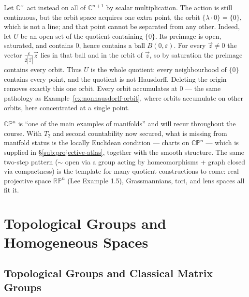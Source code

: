 \documentclass[11pt]{report}
\makeatletter
\newcounter{excounter}[section]
\newcommand{\exlabel}[1]{\edef\@currentlabel{\arabic{section}.\arabic{excounter}}\label{#1}}
\makeatother
\begin{document}
\begin{exbox}\exlabel{ex:cpn-origin}
Let $\mathbb{C}^\times$ act instead on all of $\mathbb{C}^{n+1}$ by scalar multiplication. The action is still continuous, but the orbit space acquires one extra point, the orbit $\{\lambda \cdot 0\} = \{0\}$, which is not a line; and that point cannot be separated from any other. Indeed, let $U$ be an open set of the quotient containing $\{0\}$. Its preimage is open, saturated, and contains $0$, hence contains a ball $B(0,\varepsilon)$. For every $\vec z \neq 0$ the vector $\frac{\varepsilon}{2|\vec z|}\vec z$ lies in that ball and in the orbit of $\vec z$, so by saturation the preimage contains every orbit. Thus $U$ is the whole quotient: every neighbourhood of $\{0\}$ contains every point, and the quotient is not Hausdorff. Deleting the origin removes exactly this one orbit. Every orbit accumulates at $0$ --- the same pathology as Example~\ref{ex:nonhausdorff-orbit}, where orbits accumulate on other orbits, here concentrated at a single point.
\end{exbox}

\begin{rembox}\label{rem:where-this-going}
$\mathbb{CP}^n$ is ``one of the main examples of manifolds'' and will recur throughout the course. With $T_2$ and second countability now secured, what is missing from manifold status is the locally Euclidean condition --- charts on $\mathbb{CP}^n$ --- which is supplied in \S\ref{sub:projective-atlas}, together with the smooth structure. The same two-step pattern ($\sim$ open via a group acting by homeomorphisms + graph closed via compactness) is the template for many quotient constructions to come: real projective space $\mathbb{RP}^n$ (Lee Example 1.5), Grassmannians, tori, and lens spaces all fit it.
\end{rembox}
\chapter{Topological Groups and Homogeneous Spaces}

\section{Topological Groups and Classical Matrix Groups}\label{sec:topgroups}
\end{document}
